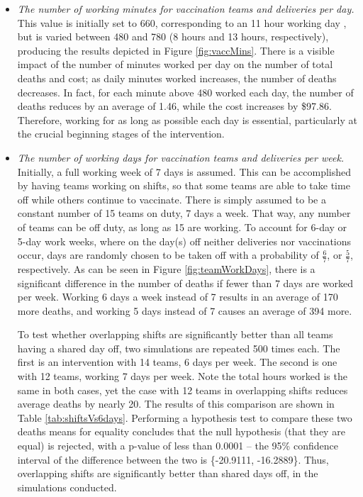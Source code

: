 \begin{itemize}
    \item \textit{The number of working minutes for vaccination teams and deliveries per day.} This value is initially set to 660, corresponding to an 11 hour working day \cite{poncin2018implementation}, but is varied between 480 and 780 (8 hours and 13 hours, respectively), producing the results depicted in Figure \ref{fig:vaccMins}. There is a visible impact of the number of minutes worked per day on the number of total deaths and cost; as daily minutes worked increases, the number of deaths decreases. In fact, for each minute above 480 worked each day, the number of deaths reduces by an average of 1.46, while the cost increases by \$97.86. Therefore, working for as long as possible each day is essential, particularly at the crucial beginning stages of the intervention.
    \item \textit{The number of working days for vaccination teams and deliveries per week.} Initially, a full working week of 7 days is assumed. This can be accomplished by having teams working on shifts, so that some teams are able to take time off while others continue to vaccinate. There is simply assumed to be a constant number of 15 teams on duty, 7 days a week. That way, any number of teams can be off duty, as long as 15 are working. To account for 6-day or 5-day work weeks, where on the day(s) off neither deliveries nor vaccinations occur, days are randomly chosen to be taken off with a probability of $\frac{6}{7}$, or $\frac{5}{7}$, respectively. As can be seen in Figure \ref{fig:teamWorkDays}, there is a significant difference in the number of deaths if fewer than 7 days are worked per week. Working 6 days a week instead of 7 results in an average of 170 more deaths, and working 5 days instead of 7 causes an average of 394 more.
    
    To test whether overlapping shifts are significantly better than all teams having a shared day off, two simulations are repeated 500 times each. The first is an intervention with 14 teams, 6 days per week. The second is one with 12 teams, working 7 days per week. Note the total hours worked is the same in both cases, yet the case with 12 teams in overlapping shifts reduces average deaths by nearly 20. The results of this comparison are shown in Table \ref{tab:shiftsVs6days}. Performing a hypothesis test to compare these two deaths means for equality concludes that the null hypothesis (that they are equal) is rejected, with a p-value of less than 0.0001 -- the 95\% confidence interval of the difference between the two is \{-20.9111, -16.2889\}. Thus, overlapping shifts are significantly better than shared days off, in the simulations conducted.
    

\end{itemize}
